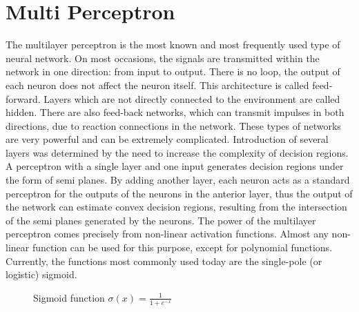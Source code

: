 \section{Multi Perceptron}
The multilayer perceptron is the most known and
most frequently used type of neural network. On
most occasions, the signals are transmitted within the
network in one direction: from input to output. There
is no loop, the output of each neuron does not affect
the neuron itself. This architecture is called feed-
forward.
Layers which are not directly connected to the
environment are called hidden. There are also
feed-back networks, which can transmit impulses in
both directions, due to reaction connections in the
network. These types of networks are very powerful
and can be extremely complicated. Introduction of several layers was
determined by the need to increase the complexity of
decision regions. A perceptron with a single layer and one
input generates decision regions under the form of
semi planes. By adding another layer, each neuron
acts as a standard perceptron for the outputs of the
neurons in the anterior layer, thus the output of the
network can estimate convex decision regions,
resulting from the intersection of the semi planes
generated by the neurons.
The power of the multilayer perceptron comes
precisely from non-linear activation functions.
Almost any non-linear function can be used for this
purpose, except for polynomial functions. Currently,
the functions most commonly used today are the
single-pole (or logistic) sigmoid.

\begin{figure}[H]
	\centering
	\caption{Sigmoid function $\sigma(x) = \frac{1}{1+e^{-x}}$}
	\label{fig:sigmoid}
\end{figure}

